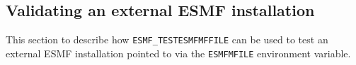 
\subsection{Validating an external ESMF installation}
\label{esmfmkfiletesting}

This section to describe how {\tt ESMF\_TESTESMFMFFILE} can be used to test
an external ESMF installation pointed to via the {\tt ESMFMFILE} environment
variable.
